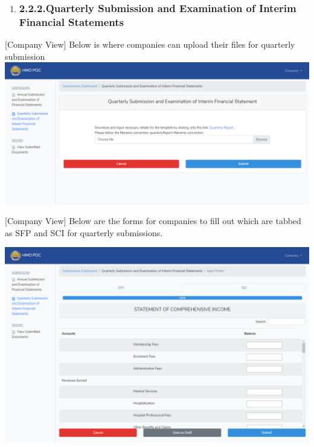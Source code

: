 \documentclass{article}
\begin{document}
\begin{enumerate}[noitemsep,topsep=\mdcompacttopsep]%

\item{}
\subsubsection{2.2.2.\hspace*{0.5em}Quarterly Submission and Examination of Interim Financial Statements}\label{sec-quarterly-submission-and-examination-of-interim-financial-statements}%
\end{enumerate}%

\noindent{}[Company View] Below is where companies can upload their files
for quarterly submission\includegraphics[keepaspectratio=true]{up-ic-screens/image167}{}%

[Company View] Below are the forms for companies to
fill out which are tabbed as SFP and SCI for quarterly submissions.%

\includegraphics[keepaspectratio=true]{up-ic-screens/image116}{}%
\end{document}
